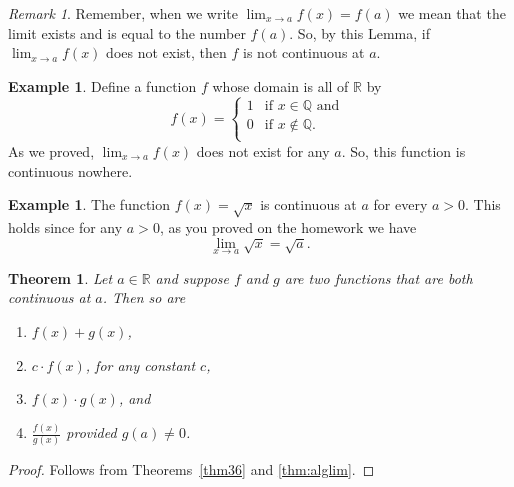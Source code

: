 \documentclass[12pt]{amsart}
\newcommand{\Q}{\mathbb{Q}}
\newcommand{\R}{{\mathbb{R}}}
\numberwithin{equation}{section}
\theoremstyle{plain} %
\newtheorem{thm}[equation]{Theorem}
\theoremstyle{definition}
\newtheorem{ex}[equation]{Example}
\theoremstyle{remark}
\newtheorem{rem}[equation]{Remark}
\begin{document}
\begin{rem} Remember, when we write $\lim_{x \to a} f(x) = f(a)$ we
  mean that the limit exists and is equal to the number $f(a)$. So, by
  this Lemma, if $\lim_{x \to a} f(x)$ does not exist, then $f$ is not
  continuous at $a$.
\end{rem}





\begin{ex} Define a function $f$ whose domain is all of $\R$  by
$$
f(x) = 
\begin{cases}
1 & \text{if $x \in \Q$ and } \\
0 & \text{if $x \notin \Q$.} \\
\end{cases}
$$
As we proved, $\lim_{x \to a} f(x)$ does not exist for any $a$. So, this function is continuous nowhere.
\end{ex}

  

\begin{ex}  The function $f(x)=\sqrt{x}$ is  continuous at $a$ for every $a>0$. This holds since for any $a > 0$, as you proved on the homework we have
  $$
  \lim_{x \to a} \sqrt{x} = \sqrt{a}.
  $$
\end{ex}






\begin{thm} Let $a\in \R$ and suppose $f$ and $g$ are two functions that are both
  continuous at $a$. Then so are
\begin{enumerate}
\item $f(x) + g(x)$,
\item $c \cdot f(x)$, for any constant $c$,
\item $f(x) \cdot g(x)$, and
\item $\frac{f(x)}{g(x)}$ provided $g(a) \ne 0$.
\end{enumerate}
\end{thm}
\begin{proof}
Follows from Theorems~\ref{thm36} and \ref{thm:alglim}.\end{proof}
\end{document}
